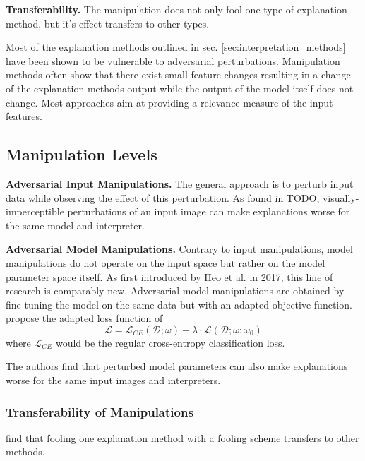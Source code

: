 \noindent\textbf{Transferability.} The manipulation does not only fool one type of explanation method, but it's effect transfers to other types. 



Most of the explanation methods outlined in sec. \autoref{sec:interpretation_methods} have been shown to be vulnerable to adversarial perturbations. 
Manipulation methods often show that there exist small feature changes resulting in a change of the explanation methods output while the output of the model itself does not change. 
Most approaches aim at providing a relevance measure of the input features. \\



\subsection{Manipulation Levels}
\label{subsec:manipulation_levels}

\noindent\textbf{Adversarial Input Manipulations.} The general approach is to perturb input data while observing the effect of this perturbation. As found in TODO, visually-imperceptible perturbations of an input image can make explanations worse for the same model and interpreter. 


\noindent\textbf{Adversarial Model Manipulations.} 
Contrary to input manipulations, model manipulations do not operate on the input space but rather on the model parameter space itself. 
As first introduced by Heo et al. \cite{fooling_nn_interpreters} in 2017, this line of research is comparably new. 
Adversarial model manipulations are obtained by fine-tuning the model on the same data but with an adapted objective function. \cite{fooling_nn_interpreters} propose the adapted loss function of $$ \mathcal{L} = \mathcal{L}_{CE}(\mathcal{D};\omega) + \lambda \cdot \mathcal{L}(\mathcal{D};\omega; \omega_0) $$ where $\mathcal{L}_{CE}$ would be the regular cross-entropy classification loss. 

The authors find that perturbed model parameters can also make explanations worse for the same input images and interpreters. 



\subsubsection{Transferability of Manipulations}
\cite{fooling_nn_interpreters} find that fooling one explanation method with a fooling scheme transfers to other methods. 


